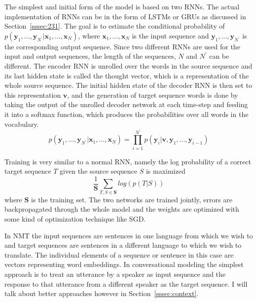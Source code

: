 \documentclass[12pt]{article}
\begin{document}
The simplest and initial form of the model is based on two RNNs. The actual implementation of RNNs can be in the form of LSTMs or GRUs as discussed in Section~\ref{sssec:231}. The goal is to estimate the conditional probability of \(p(\bm{y}_1,...,\bm{y}_{N^{'}}|\bm{x}_1,...,\bm{x}_N)\), where \(\bm{x}_1,...,\bm{x}_N\) is the input sequence and \(\bm{y}_1,...,\bm{y}_{N^{'}}\) is the corresponding output sequence. Since two different RNNs are used for the input and output sequences, the length of the sequences, \(N\) and \(N^{'}\) can be different. The encoder RNN is unrolled over the words in the source sequence and its last hidden state is called the thought vector, which is a representation of the whole source sequence. The initial hidden state of the decoder RNN is then set to this representation \(\bm{v}\), and the generation of target sequence words is done by taking the output of the unrolled decoder network at each time-step and feeding it into a softmax function, which produces the probabilities over all words in the vocabulary.
\begin{equation} \label{eq232a}
p(\bm{y}_1,...,\bm{y}_{N^{'}}|\bm{x}_1,...,\bm{x}_N)=\prod_{i=1}^{N^{'}}p(\bm{y}_i|\bm{v},\bm{y}_1,...,\bm{y}_{i-1})
\end{equation}

Training is very similar to a normal RNN, namely the log probability of a correct target sequence \(T\) given the source sequence \(S\) is maximized
\begin{equation} \label{eq232b}
\frac{1}{\bm{S}}\sum_{T,S \in \bm{S}}log(p(T|S))
\end{equation}
where \(\bm{S}\) is the training set. The two networks are trained jointly, errors are backpropagated through the whole model and the weights are optimized with some kind of optimization technique like SGD.

In NMT the input sequences are sentences in one language from which we wish to and target sequences are sentences in a different language to which we wish to translate. The individual elements of a sequence or sentence in this case are vectors representing word embeddings. In conversational modeling the simplest approach is to treat an utterance by a speaker as input sequence and the response to that utterance from a different speaker as the target sequence. I will talk about better approaches however in Section~\ref{sssec:context}.
\end{document}
